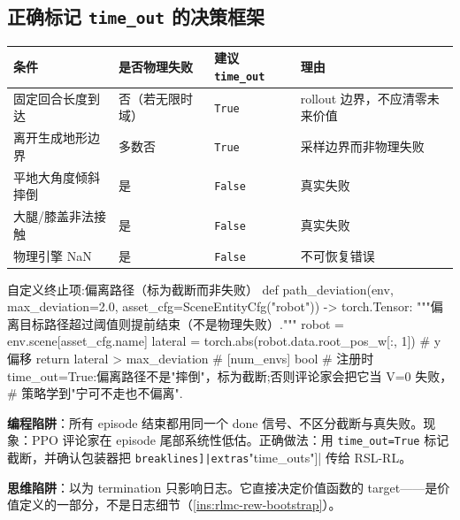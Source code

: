 \subsection{正确标记 \texttt{time\_out} 的决策框架}
\label{sec:rlmc-rew-termdecide}

\begin{center}
\small
\begin{tabular}{@{}llll@{}}
\toprule
条件 & 是否物理失败 & 建议 \verb|time_out| & 理由 \\
\midrule
固定回合长度到达 & 否（若无限时域） & \verb|True| & rollout 边界，不应清零未来价值 \\
离开生成地形边界 & 多数否 & \verb|True| & 采样边界而非物理失败 \\
平地大角度倾斜摔倒 & 是 & \verb|False| & 真实失败 \\
大腿/膝盖非法接触 & 是 & \verb|False| & 真实失败 \\
物理引擎 NaN & 是 & \verb|False| & 不可恢复错误 \\
\bottomrule
\end{tabular}
\end{center}


\begin{codebox}[Python]{自定义终止项:偏离路径（标为截断而非失败）}
def path_deviation(env, max_deviation=2.0,
                   asset_cfg=SceneEntityCfg("robot")) -> torch.Tensor:
    """偏离目标路径超过阈值则提前结束（不是物理失败）."""
    robot = env.scene[asset_cfg.name]
    lateral = torch.abs(robot.data.root_pos_w[:, 1])           # y 偏移
    return lateral > max_deviation                             # [num_envs] bool
# 注册时 time_out=True:偏离路径不是"摔倒"，标为截断;否则评论家会把它当 V=0 失败，
# 策略学到"宁可不走也不偏离".
\end{codebox}

\begin{pitfall}[两个高频终止错误]
\textbf{编程陷阱}：所有 episode 结束都用同一个 done 信号、不区分截断与真失败。现象：PPO 评论家在 episode 尾部系统性低估。正确做法：用 \verb|time_out=True| 标记截断，并确认包装器把 \Verb[breaklines]|extras["time_outs"]| 传给 RSL-RL。

\textbf{思维陷阱}：以为 termination 只影响日志。它直接决定价值函数的 target——是价值定义的一部分，不是日志细节（\cref{ins:rlmc-rew-bootstrap}）。
\end{pitfall}

